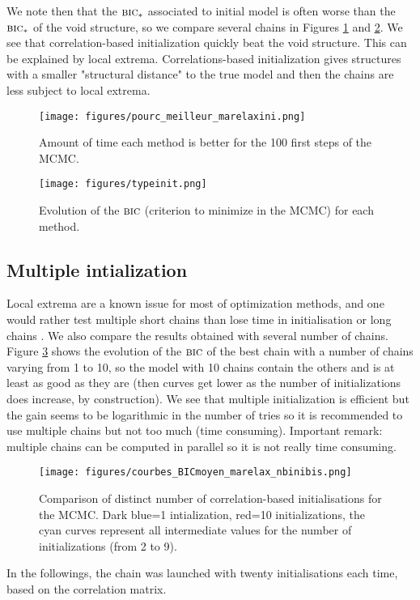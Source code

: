 \documentclass[12pt,a4paper]{report}
\begin{document}
		We note then that the $\mbox{{\sc bic}}_*$ associated to initial model is often worse than the $\mbox{{\sc bic}}_*$ of the void structure, so we compare several chains in Figures \ref{pourcini} and \ref{Bicini}.			
				We see that correlation-based initialization quickly beat the void structure. This can be explained by local extrema. Correlations-based initialization gives structures with a smaller "structural distance" to the true model and then the chains are less subject to local extrema.

	\begin{center}
		\begin{figure}[h!]
		\centering
		\texttt{[image: figures/pourc\_meilleur\_marelaxini.png]} 
		\caption{Amount of time each method is better for the 100 first steps of the MCMC. } \label{pourcini}
		\end{figure}		
	\end{center}
	
	\begin{center}
		\begin{figure}[h!]
		\centering
		\texttt{[image: figures/typeinit.png]} %
		\caption{Evolution of the $\mbox{{\sc bic}}$ (criterion to minimize in the MCMC) for each method.}\label{Bicini}
		\end{figure}
	\end{center}
	\FloatBarrier
		\subsection{Multiple intialization}	
		Local extrema are a known issue for most of optimization methods, and one would rather test multiple short chains than lose time in initialisation or long chains \cite{gilks1996markov}. 
		We also compare the results obtained with several number of chains. Figure \ref{nbini} shows the evolution of the $\mbox{{\sc bic}}$ of the best chain with a number of chains varying from 1 to 10, so the model with 10 chains contain the others and is at least as good as they are (then curves get lower as the number of initializations does increase, by construction). We see that multiple initialization is efficient but the gain seems to be logarithmic in the number of tries so it is recommended to use multiple chains but not too much (time consuming). Important remark: multiple chains can be computed in parallel so it is not really time consuming.		
			
	\begin{center}
	\begin{figure}[h!]
	\centering
		\texttt{[image: figures/courbes\_BICmoyen\_marelax\_nbinibis.png]} 
		\caption{Comparison of distinct number of correlation-based initialisations for the MCMC. Dark blue=1 intialization, red=10 initializations, the cyan curves represent all intermediate values for the number of initializations (from 2 to 9).}\label{nbini}
	\end{figure}
	\end{center}
		In the followings, the chain was launched with twenty initialisations each time, based on the correlation matrix.
\end{document}
